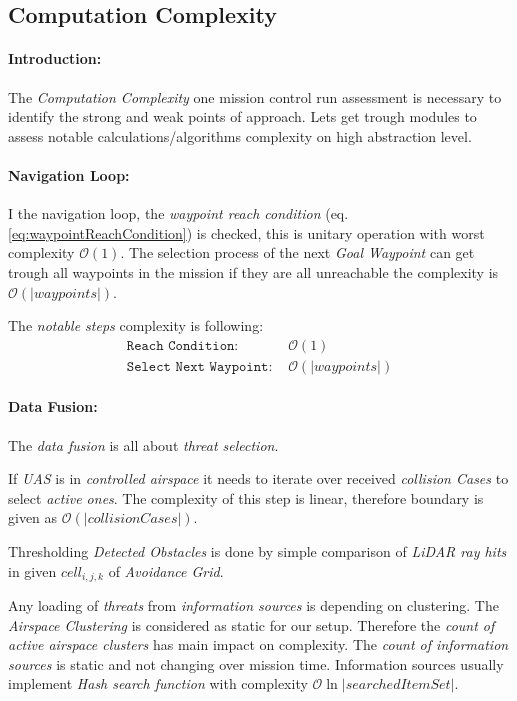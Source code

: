 \newpage
\subsection{Computation Complexity}\label{sec:MCRcomputationalComplexity}
\paragraph{Introduction:}The \emph{Computation Complexity} one mission control run assessment is necessary to identify the strong and weak points of approach. Lets get trough modules to assess notable calculations/algorithms complexity on high abstraction level.

\paragraph{Navigation Loop:} I the navigation loop, the \emph{waypoint reach condition} (eq. \ref{eq:waypointReachCondition}) is checked, this is unitary operation with worst complexity $\mathscr{O}(1)$. The selection process of the next \emph{Goal Waypoint} can get trough all waypoints in the mission if they are all unreachable the complexity is $\mathscr{O}(|waypoints|)$.

The \emph{notable steps} complexity is following:
\begin{equation*}
    \begin{aligned}
        \texttt{Reach Condition: }& \mathscr{O}(1)\\
        \texttt{Select Next Waypoint: }&\mathscr{O}(|waypoints|)
    \end{aligned}
\end{equation*}

\paragraph{Data Fusion:} The \emph{data fusion} is all about \emph{threat selection}. 

If \emph{UAS} is in \emph{controlled airspace} it needs to iterate over received \emph{collision Cases} to select \emph{active ones}. The complexity of this step is linear, therefore boundary is given as $\mathscr{O} (|collision Cases|)$.

Thresholding \emph{Detected Obstacles} is done by simple comparison of \emph{LiDAR ray hits} in given $cell_{i,j,k}$ of \emph{Avoidance Grid}.

Any loading of \emph{threats} from \emph{information sources} is depending on clustering. The \emph{Airspace Clustering} is considered as static for our setup. Therefore the \emph{count of active airspace clusters} has main impact on complexity. The \emph{count of information sources} is static and not changing over mission time. Information sources usually implement \emph{Hash search function} with complexity $\mathscr{O}\ln|searched Item Set|$.

